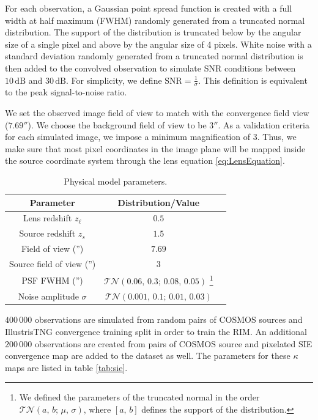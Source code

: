 \documentclass[twocolumn]{aastex631}
\begin{document}
For each observation, a Gaussian point spread function is 
created with a full width at half maximum (FWHM) 
randomly generated from a truncated normal distribution.
The support of the distribution is truncated below by the 
angular size of a single pixel and above by the angular size of 4 pixels. 
White noise with a standard deviation randomly generated from a truncated normal distribution 
is then added to the convolved observation to simulate SNR conditions between 
$10\,\mathrm{dB}$ and $30\,\mathrm{dB}$. For simplicity, we define $\mathrm{SNR} = \frac{1}{\sigma}$. 
This definition is equivalent to the peak signal-to-noise ratio. 

We set the observed image field of view to match with the convergence field view ($7.69''$). 
We choose the background field of view to be $3''$.
As a validation criteria for each simulated image, we impose 
a minimum magnification of 3. Thus, 
we make sure that most pixel coordinates in the image plane will be mapped inside the 
source coordinate system through the lens equation \eqref{eq:LensEquation}. 

\begin{table}[ht!]
\centering
\caption{Physical model parameters.}
\label{tab:phys}
\begin{tabular}{ccc}
        Parameter &  Distribution/Value \\
        \hline \hline
        Lens redshift $z_\ell$ & $0.5$ \\
        Source redshift $z_s$ & $1.5$ \\
        Field of view ('') & $7.69$ \\
        Source field of view ('') & $3$ \\
        PSF FWHM ('') & $\mathcal{TN}(0.06,\, 0.3;\, 0.08,\, 0.05)$
        \footnote{We defined the parameters of the truncated normal in the order $\mathcal{TN}(a,\, b;\, \mu,\, \sigma)$, where $[a,\, b]$ defines the support of the distribution.} \\
        Noise amplitude $\sigma$ & $\mathcal{TN}(0.001,\, 0.1;\, 0.01,\,0.03)$\\
        \hline
\end{tabular}
\end{table}

$400\,000$ observations are simulated from random pairs of COSMOS sources 
and IllustrisTNG convergence training split in order to train the RIM. 
An additional $200\,000$ observations are created from pairs 
of COSMOS source and pixelated SIE convergence map are added to the dataset 
as well. The parameters for these $\kappa$ maps are listed in table \ref{tab:sie}. 
\end{document}
